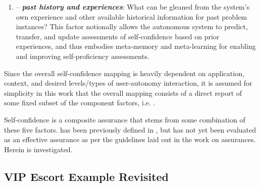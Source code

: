 \begin{enumerate}
%
\item \xP-- \textit{\textbf{past history and experiences}}: What can be gleaned from the system's own experience and other available historical information for past problem instances?  
This factor notionally allows the autonomous system to predict, transfer, and update assessments of self-confidence based on prior experiences, and thus embodies meta-memory and meta-learning for enabling and improving self-proficiency assessments. 
\end{enumerate}
    
    
    Since the overall self-confidence mapping is heavily dependent on application, context, and desired levels/types of user-autonomy interaction, it is assumed for simplicity in this work that the overall mapping consists of a direct report of some fixed subset of the component factors, i.e. \xSC. 

        

     Self-confidence \xSC{} is a composite assurance  that stems from some combination of these five factors. \xP{} has been previously defined in \cite{Aitken2016-cv}, but has not yet been evaluated as an effective assurance as per the guidelines laid out in the work on assurances. Herein \xQ{} is investigated. 

\subsection{VIP Escort Example Revisited}

